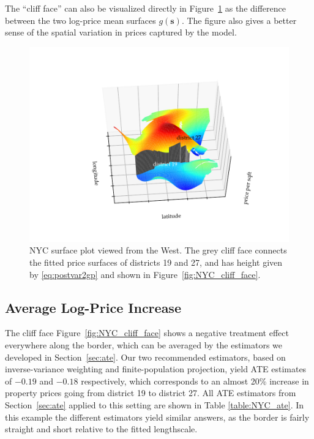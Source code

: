 \documentclass[letter]{article}
\makeatletter
\def\maxwidth{\ifdim\Gin@nat@width>\linewidth\linewidth
\else\Gin@nat@width\fi}
\let\Oldincludegraphics\includegraphics
\renewcommand{\includegraphics}[1]{\Oldincludegraphics[width=0.9\maxwidth]{#1}}
\newcommand{\svec}{\mathbold{s}}
\makeatother
\begin{document}
The ``cliff face'' can also be visualized directly in Figure~\ref{fig:NYC_3d} as the difference between the two log-price mean surfaces \(g(\svec)\).
The figure also gives a better sense of the spatial variation in prices captured by the model.
    


    	\begin{figure}
\centering
\includegraphics{../NYC/NYC_plots/NYC_surface_plot_multi_ev60az175.pdf}
\caption{\label{fig:NYC_3d}NYC surface plot viewed from the West. The grey cliff face connects the fitted price surfaces of districts 19 and 27, and has height given by \eqref{eq:postvar2gp} and shown in Figure~\ref{fig:NYC_cliff_face}.}
\end{figure}
    


    	\hypertarget{average-log-price-increase}{%
\subsection{Average Log-Price Increase}\label{average-log-price-increase}}

The cliff face Figure~\ref{fig:NYC_cliff_face} shows a negative treatment effect everywhere along the border, which can be averaged by the estimators we developed in Section~\ref{sec:ate}.
Our two recommended estimators, based on inverse-variance weighting and finite-population projection, yield ATE estimates of \(-0.19\) and \(-0.18\) respectively, which corresponds to an almost 20\% increase in property prices going from district 19 to district 27.
All ATE estimators from Section~\ref{sec:ate} applied to this setting are shown in Table \ref{table:NYC_ate}.
In this example the different estimators yield similar answers, as the border is fairly straight and short relative to the fitted lengthscale.
    
\end{document}
